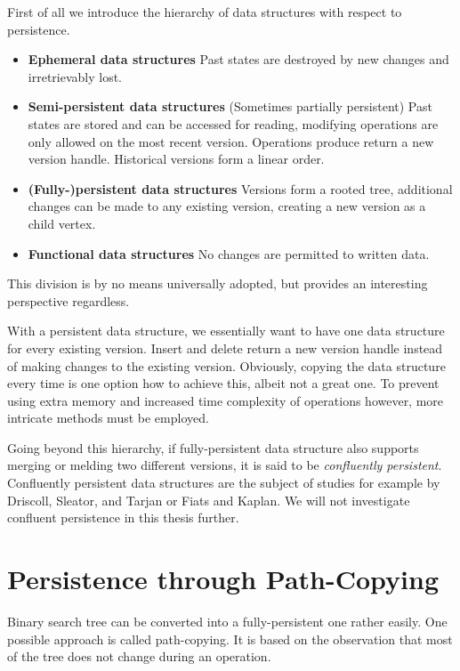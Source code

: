 First of all we introduce the hierarchy of data structures with respect to persistence.

\begin{itemize}
\item {\bfseries Ephemeral data structures} Past states are destroyed by new changes and irretrievably lost.
\item {\bfseries Semi-persistent data structures} (Sometimes partially persistent) Past states are stored and can be accessed for reading, modifying operations are only allowed on the most recent version. Operations produce return a new version handle. Historical versions form a linear order.
\item {\bfseries (Fully-)persistent data structures} Versions form a rooted tree, additional changes can be made to any existing version, creating a new version as a child vertex.
\item {\bfseries Functional data structures} No changes are permitted to written data.
\end{itemize}

This division is by no means universally adopted, but provides an interesting perspective regardless.

With a persistent data structure, we essentially want to have one data structure for every existing version. Insert and delete return a new version handle instead of making changes to the existing version. Obviously, copying the data structure every time is one option how to achieve this, albeit not a great one. To prevent using extra memory and increased time complexity of operations however, more intricate methods must be employed.

Going beyond this hierarchy, if fully-persistent data structure also supports merging or melding two different versions, it is said to be \textit{confluently persistent}. Confluently persistent data structures are the subject of studies for example by Driscoll, Sleator, and Tarjan\cite{confluently-persistent-a} or Fiats and Kaplan\cite{confluently-persistent-b}. We will not investigate confluent persistence in this thesis further.

\section{Persistence through Path-Copying}

Binary search tree can be converted into a fully-persistent one rather easily.
One possible approach is called path-copying. It is based on the observation that most of the tree does not change during an operation.

